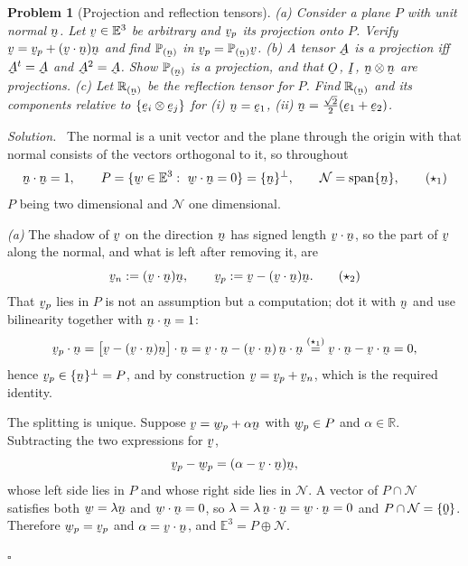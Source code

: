 \documentclass[17pt,a4paper]{extreport}
\DeclareRobustCommand{\vek}[1]{\underaccent{\tilde}{#1}}
\newcommand{\Rn}{\mathbb{R}}
\newcommand{\Et}{\mathbb{E}^{3}}
\newcommand{\Proj}[1]{\mathbb{P}_{(#1)}}
\newcommand{\Refl}[1]{\mathbb{R}_{(#1)}}
\newcommand{\I}{\vek{I}}
\newcommand{\Ob}{\vek{O}}
\newcommand{\bv}{\vek{v}}
\newcommand{\bw}{\vek{w}}
\newcommand{\be}{\vek{e}}
\newcommand{\bn}{\vek{n}}
\newcommand{\bze}{\vek{0}}
\newcommand{\bA}{\vek{A}}
\newcommand{\ip}[2]{#1\cdot#2}
\theoremstyle{scplain}
\theoremstyle{scdefn}
\theoremstyle{scplain}
\newtheorem{problem}{Problem}
\newenvironment{solution}
 {\par\smallskip\noindent\textit{Solution.}\ }
 {\hfill$\square$\par\medskip}
\begin{document}
\begin{problem}[Projection and reflection tensors]
\textup{(a)} Consider a plane $P$ with unit normal $\bn$. Let $\bv\in\Et$ be
arbitrary and $\bv_p$ its projection onto $P$. Verify
$\bv=\bv_p+(\ip\bv\bn)\bn$ and find $\Proj{\bn}$ in
$\bv_p=\Proj{\bn}\bv$.
\textup{(b)} A tensor $\bA$ is a \emph{projection} iff $\bA^{t}=\bA$ and
$\bA^{2}=\bA$. Show $\Proj{\bn}$ is a projection, and that
$\Ob$, $\I$, $\bn\otimes\bn$ are projections.
\textup{(c)} Let $\Refl{\bn}$ be the \emph{reflection} tensor for $P$. Find
$\Refl{\bn}$ and its components relative to $\{\be_i\otimes\be_j\}$ for
\textup{(i)} $\bn=\be_1$, \textup{(ii)}
$\bn=\tfrac{\sqrt2}{2}(\be_1+\be_2)$.
\end{problem}

\begin{solution}
The normal is a unit vector and the plane through the origin with that
normal consists of the vectors orthogonal to it, so throughout
\begin{equation}
   \ip\bn\bn=1,\qquad
   P=\{\bw\in\Et:\ \ip\bw\bn=0\}=\{\bn\}^{\perp},\qquad
   \mathcal{N}=\operatorname{span}\{\bn\}, \tag{$\star_1$}
\end{equation}
$P$ being two dimensional and $\mathcal{N}$ one dimensional.

\emph{(a)} The shadow of $\bv$ on the direction $\bn$ has signed length
$\ip\bv\bn$, so the part of $\bv$ along the normal, and what is left after
removing it, are
\begin{equation}
   \bv_n:=(\ip\bv\bn)\bn,\qquad \bv_p:=\bv-(\ip\bv\bn)\bn . \tag{$\star_2$}
\end{equation}
That $\bv_p$ lies in $P$ is not an assumption but a computation; dot it with
$\bn$ and use bilinearity together with $\ip\bn\bn=1$:
\[
   \ip{\bv_p}{\bn}=\ip{\big[\bv-(\ip\bv\bn)\bn\big]}{\bn}
   =\ip\bv\bn-(\ip\bv\bn)\,\ip\bn\bn
   \overset{(\star_1)}{=}\ip\bv\bn-\ip\bv\bn=0 ,
\]
hence $\bv_p\in\{\bn\}^{\perp}=P$, and by construction $\bv=\bv_p+\bv_n$,
which is the required identity.

The splitting is unique. Suppose $\bv=\bw_p+\alpha\bn$ with $\bw_p\in P$ and
$\alpha\in\Rn$. Subtracting the two expressions for $\bv$,
\[
   \bv_p-\bw_p=(\alpha-\ip\bv\bn)\bn ,
\]
whose left side lies in $P$ and whose right side lies in $\mathcal{N}$. A
vector of $P\cap\mathcal{N}$ satisfies both $\bw=\lambda\bn$ and
$\ip\bw\bn=0$, so $\lambda=\lambda\,\ip\bn\bn=\ip\bw\bn=0$ and
$P\cap\mathcal{N}=\{\bze\}$. Therefore $\bw_p=\bv_p$ and
$\alpha=\ip\bv\bn$, and $\Et=P\oplus\mathcal{N}$.


\end{solution}
\end{document}
